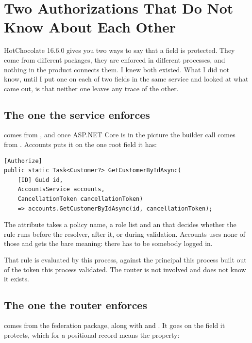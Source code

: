\section{Two Authorizations That Do Not Know About Each Other}
\label{sec:ch15-two-authorizations}
%

HotChocolate 16.6.0 gives you two ways to say that a field is protected. They
come from different packages, they are enforced in different processes, and
nothing in the product connects them. I knew both existed. What I did not know,
until I put one on each of two fields in the same service and looked at what
came out, is that neither one leaves any trace of the other.

\subsection*{The one the service enforces}

%
\code{[Authorize]} comes from , and once
ASP.NET Core is in the picture the builder call comes from
. Accounts puts it on the one root
field it has:

\begin{verbatim}
[Authorize]
public static Task<Customer?> GetCustomerByIdAsync(
    [ID] Guid id,
    AccountsService accounts,
    CancellationToken cancellationToken)
    => accounts.GetCustomerByIdAsync(id, cancellationToken);
\end{verbatim}

The attribute takes a policy name, a role list and an  that
decides whether the rule runs before the resolver, after it, or during
validation. Accounts uses none of those and gets the bare meaning: there has to
be somebody logged in.

That rule is evaluated by this process, against the principal this process
built out of the token this process validated. The router is not involved and
does not know it exists.

\subsection*{The one the router enforces}

%
\code{[RequiresScopes]} comes from the federation package, along with
\code{[Authenticated]} and \code{[Policy]}. It goes on the field it protects,
which for a positional record means the property:

